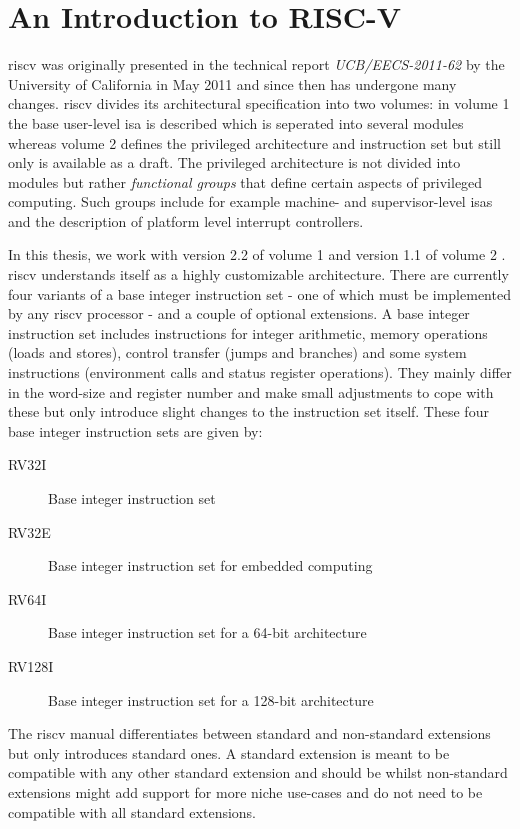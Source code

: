 \section{An Introduction to RISC-V}

\gls{riscv} was originally presented in the technical report \textit{UCB/EECS-2011-62} by the University of California in May 2011 \cite{RiscVISA-org} and since then has undergone many changes.
\gls{riscv} divides its architectural specification into two volumes: in volume 1 the base user-level \gls{isa} is described which is seperated into several modules whereas volume 2 defines the privileged architecture and instruction set but still only is available as a draft.
The privileged architecture is not divided into modules but rather \textit{functional groups} that define certain aspects of privileged computing.
Such groups include for example machine- and supervisor-level \glspl{isa} and the description of platform level interrupt controllers.


In this thesis, we work with version 2.2 of volume 1 \cite{RiscVISA} and version 1.1 of volume 2 \cite{RiscVISAP}.
\gls{riscv} understands itself as a highly customizable architecture.
There are currently four variants of a base integer instruction set - one of which must be implemented by any \gls{riscv} processor - and a couple of optional extensions.
A base integer instruction set includes instructions for integer arithmetic, memory operations (loads and stores), control transfer (jumps and branches) and some system instructions (environment calls and status register operations).
They mainly differ in the word-size and register number and make small adjustments to cope with these but only introduce slight changes to the instruction set itself.
These four base integer instruction sets are given by:
\begin{description}
    \item[RV32I] Base integer instruction set
    \item[RV32E] Base integer instruction set for embedded computing
    \item[RV64I] Base integer instruction set for a 64-bit architecture
    \item[RV128I] Base integer instruction set for a 128-bit architecture
\end{description}

The \gls{riscv} manual differentiates between standard and non-standard extensions but only introduces standard ones.
A standard extension is meant to be compatible with any other standard extension and should be  whilst non-standard extensions might add support for more niche use-cases and do not need to be compatible with all standard extensions.

